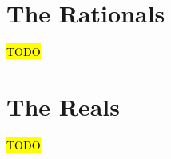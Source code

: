 \section{The Rationals}
\begin{theorem}
    \hl{TODO}
\end{theorem}

\section{The Reals}
\begin{theorem}
    \hl{TODO}
\end{theorem}




